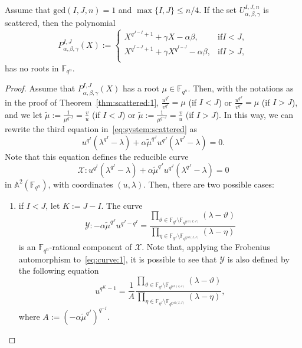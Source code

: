 \begin{theorem}
\label{thm:scattered:2}
Assume that $\mathrm{gcd}(I,J,n)=1$ and $\max\{I,J\}\leq n/4$.
If the set $U_{\alpha, \beta, \gamma}^{I,J,n}$ is scattered, then 
the polynomial 
\begin{equation}
    P^{I,J}_{\alpha,\beta,\gamma}(X):=\begin{cases}
    X^{q^{J-I}+1} + \gamma X - \alpha\beta,& \mathrm{if } I<J,\\ 
     X^{q^{I-J}+1} + \gamma X^{q^{I-J}} - \alpha\beta,& \mathrm{if } I>J,\\
    \end{cases}
\end{equation}
has no roots in $\mathbb{F}_{q^n}$.
\end{theorem}


\begin{proof}
Assume that $P^{I,J}_{\alpha,\beta,\gamma}(X)$ has a root $\mu \in \mathbb{F}_{q^n}$. Then, with the notations as in the proof of Theorem~\ref{thm:scattered:1}, $\frac{u^{q^I}}{v^{q^I}}=\mu$ (if $I < J$) or $\frac{u^{q^J}}{v^{q^J}}=\mu$ (if $I > J$), and we let $\tilde{\mu}:=\frac{1}{\mu^{q^{-I}}}=\frac{v}{u}$ (if $I < J$) or $\tilde{\mu}:=\frac{1}{\mu^{q^{-J}}}=\frac{v}{u}$ (if $I > J$). In this way, we can rewrite the third equation in~\eqref{eq:system:scattered} as
\begin{equation*}
    u^{q^I}\left(\lambda^{q^I}-\lambda\right) + \alpha\tilde{\mu}^{q^J}u^{q^J}\left(\lambda^{q^J}-\lambda\right) = 0.
\end{equation*}
Note that this equation defines the reducible curve 
\begin{equation*}
    \mathcal{X}: u^{q^I}\left(\lambda^{q^I}-\lambda\right) + \alpha\tilde{\mu}^{q^J}u^{q^J}\left(\lambda^{q^J}-\lambda\right) = 0
\end{equation*}
in $\mathbb{A}^2(\mathbb{F}_{q^n})$, with coordinates $(u,\lambda)$. Then, there are two possible cases:

\begin{enumerate}
    \item if $I < J$, let $K:=J - I$. The curve
\begin{equation}
\label{eq:curve:1}
    \mathcal{Y}: -\alpha \tilde{\mu}^{q^J}u^{q^J-q^I} = \frac{\prod_{\vartheta\in \mathbb{F}_{q^I}\setminus \mathbb{F}_{q^{\mathrm{gcd}(I,J)}}}\left(\lambda - \vartheta\right)}{\prod_{\eta\in \mathbb{F}_{q^J}\setminus \mathbb{F}_{q^{\mathrm{gcd}(I,J)}}}\left(\lambda - \eta\right)} 
\end{equation}
is an $\mathbb{F}_{q^n}$-rational component of $\mathcal{X}$.
Note that, applying the Frobenius automorphism to~\eqref{eq:curve:1}, it is possible to see that $\mathcal{Y}$ is also defined by the following equation
\begin{equation}
    \label{eq:curve:frobenius:1}
    u^{q^K-1} = \frac{1}{A} \frac{\prod_{\vartheta\in \mathbb{F}_{q^I}\setminus \mathbb{F}_{q^{\mathrm{gcd}(I,J)}}}\left(\lambda - \vartheta\right)}{\prod_{\eta\in \mathbb{F}_{q^J}\setminus \mathbb{F}_{q^{\mathrm{gcd}(I,J)}}}\left(\lambda - \eta\right)}, 
\end{equation}
where $A:=\left(-\alpha\tilde{\mu}^{q^J}\right)^{q^{-I}}$.


\end{enumerate}
\end{proof}
